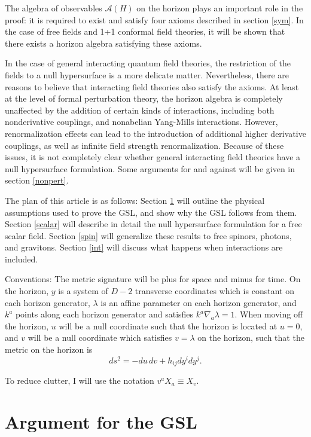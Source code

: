 \documentclass{article}
\begin{document}
The algebra of observables $\mathcal{A}(H)$ on the horizon plays an important role in the proof: it is required to exist and satisfy four axioms described in section \ref{sym}.  In the case of free fields and 1+1 conformal field theories, it will be shown that there exists a horizon algebra satisfying these axioms.

In the case of general interacting quantum field theories, the restriction of the fields to a null hypersurface is a more delicate matter.  Nevertheless, there are reasons to believe that interacting field theories also satisfy the axioms.  At least at the level of formal perturbation theory, the horizon algebra is completely unaffected by the addition of certain kinds of interactions, including both nonderivative couplings, and nonabelian Yang-Mills interactions.  However, renormalization effects can lead to the introduction of additional higher derivative couplings, as well as infinite field strength renormalization.  Because of these issues, it is not completely clear whether general interacting field theories have a null hypersurface formulation.  Some arguments for and against will be given in section \ref{nonpert}.

The plan of this article is as follows: Section \ref{arg} will outline the physical assumptions used to prove the GSL, and show why the GSL follows from them.  Section \ref{scalar} will describe in detail the null hypersurface formulation for a free scalar field.  Section \ref{spin} will generalize these results to free spinors, photons, and gravitons.  Section \ref{int} will discuss what happens when interactions are included.

Conventions: The metric signature will be plus for space and minus for time.  On the horizon, $y$ is a system of $D-2$ transverse coordinates which is constant on each horizon generator, $\lambda$ is an affine parameter on each horizon generator, and $k^a$ points along each horizon generator and satisfies $k^a \nabla_a \lambda = 1$.  When moving off the horizon, $u$ will be a null coordinate such that the horizon is located at $u = 0$, and $v$ will be a null coordinate which satisfies $v = \lambda$ on the horizon, such that the metric on the horizon is
\begin{equation}
ds^2 = -du\,dv + h_{ij} dy^i dy^j.
\end{equation}

To reduce clutter, I will use the notation $v^a X_a \equiv X_v$.

\section{Argument for the GSL}\label{arg}
\end{document}
